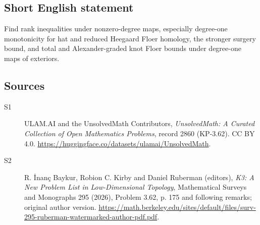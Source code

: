 \documentclass[11pt]{article}
\begin{document}
\subsection{Short English statement}
Find rank inequalities under nonzero-degree maps, especially degree-one monotonicity for hat and reduced Heegaard Floer homology, the stronger surgery bound, and total and Alexander-graded knot Floer bounds under degree-one maps of exteriors.
\subsection{Sources}
\begin{description}
\item[\hypertarget{source:2860:1}{S1}] ULAM.AI and the UnsolvedMath Contributors, \emph{UnsolvedMath: A Curated Collection of Open Mathematics Problems}, record 2860 (KP-3.62). CC BY 4.0. \url{https://huggingface.co/datasets/ulamai/UnsolvedMath}.
\item[\hypertarget{source:2860:2}{S2}] R. İnanç Baykur, Robion C. Kirby and Daniel Ruberman (editors), \emph{K3: A New Problem List in Low-Dimensional Topology}, Mathematical Surveys and Monographs 295 (2026), Problem 3.62, p. 175 and following remarks; original author version. \url{https://math.berkeley.edu/sites/default/files/surv-295-ruberman-watermarked-author-pdf.pdf}.
\end{description}
\label{end:2860}
\end{document}
